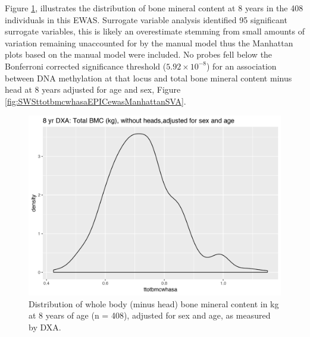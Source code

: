 \documentclass[
]{book}
\begin{document}
Figure \ref{fig:SWSttotbmcwhasa}, illustrates the distribution of bone mineral content at 8 years in the 408 individuals in this EWAS.
Surrogate variable analysis identified 95 significant surrogate variables, this is likely an overestimate stemming from small amounts of variation remaining unaccounted for by the manual model thus the Manhattan plots based on the manual model were included.
No probes fell below the Bonferroni corrected significance threshold (\(5.92\times10^{-8}\)) for an association between DNA methylation at that locus and total bone mineral content minus head at 8 years adjusted for age and sex, Figure \ref{fig:SWSttotbmcwhasaEPICewasManhattanSVA}.

\begin{figure}

{\centering \includegraphics[width=0.8\linewidth]{figs/SWS8yrBMCdist} 

}

\caption{Distribution of whole body (minus head) bone mineral content in kg at 8 years of age (n = 408), adjusted for sex and age, as measured by DXA.}\label{fig:SWSttotbmcwhasa}
\end{figure}
\end{document}
